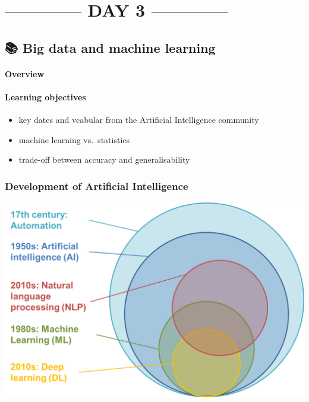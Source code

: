 \documentclass[
  letterpaper,
  DIV=11,
  numbers=noendperiod]{scrreprt}
\begin{document}
\part{------------ DAY 3 ------------}

\hypertarget{big-data-and-machine-learning}{%
\chapter{\texorpdfstring{{📚} Big data and machine
learning}{📚 Big data and machine learning}}\label{big-data-and-machine-learning}}

\hypertarget{overview-7}{%
\subsection{Overview}\label{overview-7}}

\hypertarget{learning-objectives-8}{%
\subsection{Learning objectives}\label{learning-objectives-8}}

\begin{itemize}
\item
  key dates and vcabular from the Artificial Intelligence community
\item
  machine learning vs.~statistics
\item
  trade-off between accuracy and generalisability
\end{itemize}

\hypertarget{development-of-artificial-intelligence}{%
\section{Development of Artificial
Intelligence}\label{development-of-artificial-intelligence}}

\includegraphics{./images/paste-FA238456.png}
\end{document}
